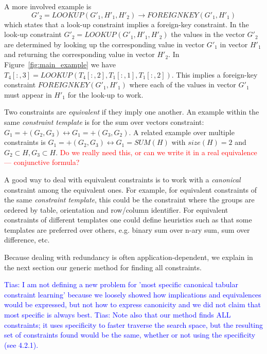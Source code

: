 \documentclass{sig-alternate-05-2015}
\newcommand{\tias}[1]{\textcolor{blue}{{\sc Tias:} #1}\xspace}
\newcommand{\format}[1]{\textit{#1}\xspace}
\newcommand{\template}{\format{constraint template}}
\newcommand{\range}[3]{\ensuremath{#1[#2,#3]}}
\newcommand{\rangeall}{:}
\newcommand{\eccalc}[2]{\ensuremath{#1 = #2}}
\newcommand{\ecfkey}[2]{\ensuremath{\mathit{FOREIGNKEY}(#1,#2)}}
\newcommand{\eclookupf}[4]{\ensuremath{\mathit{LOOKUP}_{\mathit{#4}}(#1, #2, #3)}}
\newcommand{\eclookup}[4]{\eccalc{#1}{\eclookupf{#2}{#3}{#4}{}}}
\newcommand{\luc}[1]{{\textcolor{red}{#1}}}
\begin{document}
A more involved example is
$$\eclookup{G'_2}{G'_1}{H'_1}{H'_2} \rightarrow \ecfkey{G'_1}{H'_1}$$
which states
that a look-up constraint implies a foreign-key constraint. In the look-up constraint $\eclookup{G'_2}{G'_1}{H'_1}{H'_2}$ the values in the vector $G'_2$ are determined by looking up the corresponding value in vector $G'_1$ in vector $H'_1$ and returning the corresponding value in vector $H'_2$. In Figure~\ref{fig:main_example} we have $\eclookup{\range{T_{4}}{\rangeall}{3}}{\range{T_{4}}{\rangeall}{2}}{\range{T_{1}}{\rangeall}{1}}{\range{T_{1}}{\rangeall}{2}}$. This implies a foreign-key constraint $\ecfkey{G'_1}{H'_1}$ where each of the values in vector $G'_1$ must appear in $H'_1$ for the look-up to work.

Two constraints are \textit{equivalent} if they imply one another. %
An example within the same \template is for the sum over vectors constraint: $G_1 = +(G_2, G_3) \leftrightarrow G_1 = +(G_3, G_2)$. A related example over multiple constraints is $G_1 = +(G_2, G_3) \leftrightarrow G_1 = \textit{SUM}(H)$ with $\textit{size}(H) = 2$ and $G_2 \subset H, G_3 \subset H$.
\luc{Do we really need this, or can we write it in a real equivalence --- conjunctive formula?}

A good way to deal with equivalent constraints is to work with a \textit{canonical} constraint among the equivalent ones. For example, for equivalent constraints of the same \template, this could be the constraint where the groups are ordered by table, orientation and row/column identifier. For equivalent constraints of different templates one could define heuristics such as that some templates are preferred over others, e.g. binary sum over n-ary sum, sum over difference, etc.

Because dealing with redundancy is often application-dependent, we explain in the next section our generic method for finding all constraints.

\tias{I am not defining a new problem for 'most specific canonical tabular constraint learning' because we loosely showed how implications and equivalences would be expressed, but not how to express canonicity and we did not claim that most specific is always best.}
\tias{Note also that our method finds ALL constraints; it uses specificity to faster traverse the search space, but the resulting set of constraints found would be the same, whether or not using the specificity (see 4.2.1).}
\end{document}

